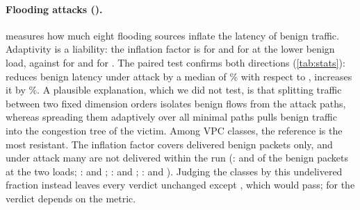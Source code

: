 \paragraph{Flooding attacks ().}  measures how much eight flooding sources inflate the latency of benign traffic. Adaptivity is a liability: the inflation factor is  for  and  for  at the lower benign load, against  for  and  for . The paired test confirms both directions (\cref{tab:stats}):  reduces benign latency under attack by a median of \% with respect to ,  increases it by \%. A plausible explanation, which we did not test, is that splitting traffic between two fixed dimension orders isolates benign flows from the attack paths, whereas spreading them adaptively over all minimal paths pulls benign traffic into the congestion tree of the victim. Among VPC classes, the reference  is the most resistant. The inflation factor covers delivered benign packets only, and under attack many are not delivered within the run (:  and  of the benign packets at the two loads; :  and ; :  and ; :  and ). Judging the classes by this undelivered fraction instead leaves every  verdict unchanged except , which would pass; for  the verdict depends on the metric.

\begin{table}[tbp]
\centering
\caption{Flooding attack (): benign mean latency without attack and inflation factor (latency with eight attackers divided by latency without) at two benign loads, five seeds; no run deadlocked.}
\label{tab:d11}
\small

\end{table}

